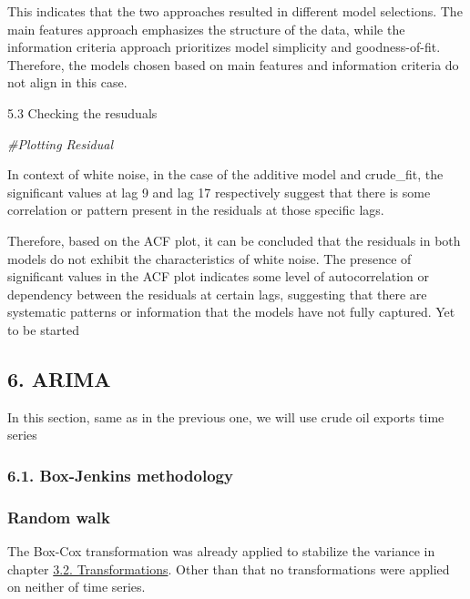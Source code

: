 \documentclass[
]{article}
\newenvironment{Shaded}{\begin{snugshade}}{\end{snugshade}}
\newcommand{\CommentTok}[1]{\textcolor[rgb]{0.56,0.35,0.01}{\textit{#1}}}
\begin{document}
This indicates that the two approaches resulted in different model
selections. The main features approach emphasizes the structure of the
data, while the information criteria approach prioritizes model
simplicity and goodness-of-fit. Therefore, the models chosen based on
main features and information criteria do not align in this case.

5.3 Checking the resuduals

\begin{Shaded}
\begin{Highlighting}[]
\CommentTok{\#Plotting Residual}
\end{Highlighting}
\end{Shaded}

In context of white noise, in the case of the additive model and
crude\_fit, the significant values at lag 9 and lag 17 respectively
suggest that there is some correlation or pattern present in the
residuals at those specific lags.

Therefore, based on the ACF plot, it can be concluded that the residuals
in both models do not exhibit the characteristics of white noise. The
presence of significant values in the ACF plot indicates some level of
autocorrelation or dependency between the residuals at certain lags,
suggesting that there are systematic patterns or information that the
models have not fully captured. Yet to be started

\hypertarget{arima}{%
\subsection{6. ARIMA}\label{arima}}

In this section, same as in the previous one, we will use crude oil
exports time series

\hypertarget{box-jenkins-methodology}{%
\subsubsection{6.1. Box-Jenkins
methodology}\label{box-jenkins-methodology}}

\hypertarget{random-walk}{%
\subsubsection{Random walk}\label{random-walk}}

The Box-Cox transformation was already applied to stabilize the variance
in chapter \protect\hyperlink{transformations}{3.2. Transformations}.
Other than that no transformations were applied on neither of time
series.
\end{document}

